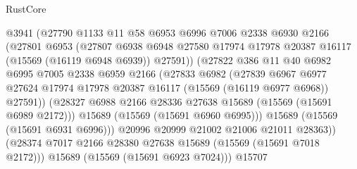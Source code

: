 \begin{lexlean}{RustCore}
\begin{coremodule}
                          @3941
                          (@27790
                            @1133
                            @11
                            @58
                            @6953
                            @6996
                            @7006
                            @2338
                            @6930
                            @2166
                            (@27801
                              @6953
                              (@27807
                                @6938
                                @6948
                                @27580
                                @17974
                                @17978
                                @20387
                                @16117
                                (@15569 (@16119 @6948 @6939))
                                @27591))
                            (@27822
                              @386
                              @11
                              @40
                              @6982
                              @6995
                              @7005
                              @2338
                              @6959
                              @2166
                              (@27833
                                @6982
                                (@27839
                                  @6967
                                  @6977
                                  @27624
                                  @17974
                                  @17978
                                  @20387
                                  @16117
                                  (@15569 (@16119 @6977 @6968))
                                  @27591))
                              (@28327
                                @6988
                                @2166
                                @28336
                                @27638
                                @15689
                                (@15569 (@15691 @6989 @2172)))
                              @15689
                              (@15569 (@15691 @6960 @6995)))
                            @15689
                            (@15569 (@15691 @6931 @6996)))
                          @20996
                          @20999
                          @21002
                          @21006
                          @21011
                          @28363))
                      (@28374 @7017 @2166 @28380 @27638 @15689 (@15569 (@15691 @7018 @2172)))
                      @15689
                      (@15569 (@15691 @6923 @7024)))
                    @15707

\end{coremodule}
\end{lexlean}
